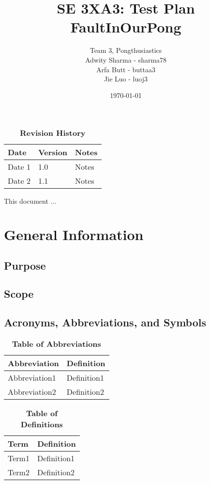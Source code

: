 \documentclass[12pt, titlepage]{article}
\title{SE 3XA3: Test Plan\\FaultInOurPong}
\author{Team 3, Pongthusiastics
		\\ Adwity Sharma - sharma78
		\\ Arfa Butt - buttaa3
		\\ Jie Luo - luoj3
}
\date{\today}
\begin{document}
\maketitle
{}
\tableofcontents
\listoftables
\listoffigures
\begin{table}[bp]
\caption{\bf Revision History}
\begin{tabularx}{\textwidth}{p{3cm}p{2cm}X}
\toprule {\bf Date} & {\bf Version} & {\bf Notes}\\
\midrule
Date 1 & 1.0 & Notes\\
Date 2 & 1.1 & Notes\\
\bottomrule
\end{tabularx}
\end{table}
\newpage
{}
This document ...
\section{General Information}
\subsection{Purpose}
\subsection{Scope}
\subsection{Acronyms, Abbreviations, and Symbols}
	
\begin{table}[hbp]
\caption{\textbf{Table of Abbreviations}} \label{Table}
\begin{tabularx}{\textwidth}{p{3cm}X}
\toprule
\textbf{Abbreviation} & \textbf{Definition} \\
\midrule
Abbreviation1 & Definition1\\
Abbreviation2 & Definition2\\
\bottomrule
\end{tabularx}
\end{table}
\begin{table}[!htbp]
\caption{\textbf{Table of Definitions}} \label{Table}
\begin{tabularx}{\textwidth}{p{3cm}X}
\toprule
\textbf{Term} & \textbf{Definition}\\
\midrule
Term1 & Definition1\\
Term2 & Definition2\\
\bottomrule
\end{tabularx}
\end{table}	
\end{document}
